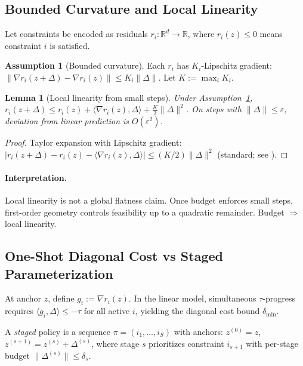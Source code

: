 \documentclass{article}
\theoremstyle{plain}
\newtheorem{lemma}[theorem]{Lemma}
\theoremstyle{definition}
\newtheorem{assumption}[theorem]{Assumption}
\theoremstyle{remark}
\begin{document}
\subsection{Bounded Curvature and Local Linearity}
Let constraints be encoded as residuals $r_i:\mathbb{R}^d \to \mathbb{R}$, where $r_i(z)\le 0$ means constraint $i$ is satisfied.

\begin{assumption}[Bounded curvature]
\label{ass:bounded_curvature}
Each $r_i$ has $K_i$-Lipschitz gradient: $\|\nabla r_i(z+\Delta)-\nabla r_i(z)\| \le K_i\|\Delta\|$. Let $K:=\max_i K_i$.
\end{assumption}

\begin{lemma}[Local linearity from small steps]
\label{lem:taylor_remainder}
Under Assumption~\ref{ass:bounded_curvature},
$r_i(z+\Delta) \le r_i(z) + \langle \nabla r_i(z),\Delta\rangle + \frac{K}{2}\|\Delta\|^2$.
On steps with $\|\Delta\|\le \varepsilon$, deviation from linear prediction is $O(\varepsilon^2)$.
\end{lemma}
\begin{proof}
Taylor expansion with Lipschitz gradient: $|r_i(z+\Delta) - r_i(z) - \langle\nabla r_i(z),\Delta\rangle| \le (K/2)\|\Delta\|^2$ (standard; see \citet{nesterov2018lectures}).
\end{proof}

\paragraph{Interpretation.}
Local linearity is not a global flatness claim. Once budget enforces small steps, first-order geometry controls feasibility up to a quadratic remainder. Budget $\Rightarrow$ local linearity.

\subsection{One-Shot Diagonal Cost vs Staged Parameterization}
At anchor $z$, define $g_i := \nabla r_i(z)$. In the linear model, simultaneous $\tau$-progress requires $\langle g_i,\Delta\rangle \le -\tau$ for all active $i$, yielding the diagonal cost bound $\delta_{\min}$.

A \emph{staged} policy is a sequence $\pi=(i_1,\ldots,i_S)$ with anchors:
$z^{(0)}=z$, $z^{(s+1)} = z^{(s)} + \Delta^{(s)}$,
where stage $s$ prioritizes constraint $i_{s+1}$ with per-stage budget $\|\Delta^{(s)}\|\le \delta_s$.
\end{document}
